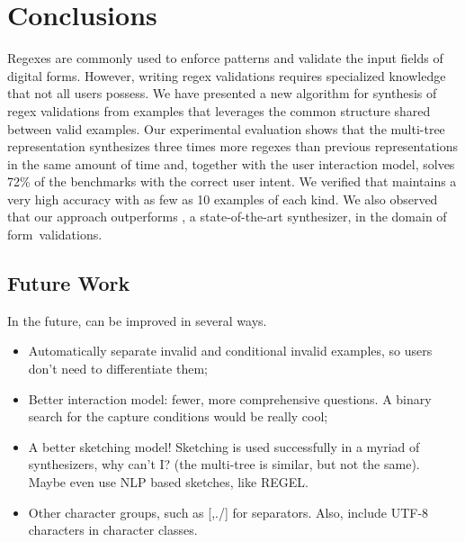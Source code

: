 \chapter{Conclusions}
\label{chap:conclusions}

Regexes are commonly used to enforce patterns and validate the input fields of digital forms. However, writing regex validations requires specialized knowledge that not all users possess.
%
We have presented a new algorithm for synthesis of regex validations from examples that leverages the common structure shared between valid examples. Our experimental evaluation shows that the multi-tree representation synthesizes three times more regexes than previous representations in the same amount of time and, together with the user interaction model, \Forest{} solves 72\% of the benchmarks with the correct user intent. We verified that \Forest{} maintains a very high accuracy with
as few as 10 examples of each kind.
We also observed that our approach outperforms \Regel{}, a state-of-the-art synthesizer, in the domain of form~validations.

\section{Future Work}
In the future, \Forest{} can be improved in several ways.

\begin{itemize}
    \item Automatically separate invalid and conditional invalid examples, so users don't need to differentiate them;
    
    \item Better interaction model: fewer, more comprehensive questions. A binary search for the capture conditions would be really cool;
    
    \item A better sketching model! Sketching is used successfully in a myriad of synthesizers, why can't I? (the multi-tree is similar, but not the same). Maybe even use NLP based sketches, like REGEL.
    
    \item Other character groups, such as [,./] for separators. Also, include UTF-8 characters in character classes.
\end{itemize}